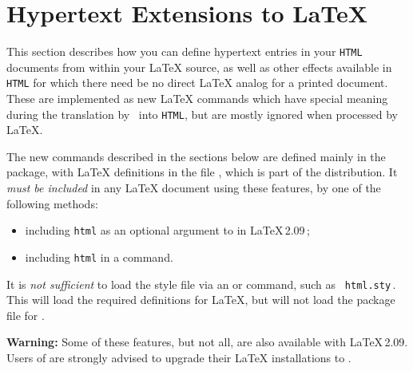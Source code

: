 \section{Hypertext Extensions to \LaTeX}
\label{sec:hyp}

\noindent
This {section} describes how you can define hypertext 
entries in your \texttt{HTML} documents from within your \LaTeX{} source,
as well as other effects available in \texttt{HTML} for which
there need be no direct \LaTeX{} analog for a printed document.
These are implemented as new \LaTeX{} commands which have special 
meaning during the translation by \latextohtml\ into \texttt{HTML}, 
but are mostly ignored when processed by \LaTeX.

%
\html{\\}%
The new commands described in the sections 
below are defined mainly in the  package,
with \LaTeX{} definitions in the file ,
which is part of the \latextohtml{} distribution. 
It \emph{must be included} in any \LaTeX{} document using these features, 
by one of the following methods:

\begin{itemize}%
\item including \texttt{html} as an optional argument 
to  in \LaTeX\,2.09\,;
\item including \texttt{html} in a \LaTeXe{}  command.
\end{itemize}

\noindent
It is \emph{not sufficient} to load the style file via an  or
 command, such as \verb| html.sty|\,.
This will load the required definitions for \LaTeX, but will not load
the  package file for \latextohtml.

\smallskip\noindent
\textbf{Warning: } Some of these features, but not all, are also available
with \LaTeX{}\,2.09.\html{\\}
Users of \latextohtml{} are strongly advised to upgrade
their \LaTeX{} installations to \LaTeXe{}. 

